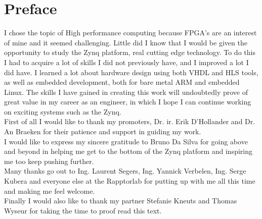 

\chapter*{Preface}


I chose the topic of High performance computing because FPGA's are an interest of mine and it seemed challenging. Little did I know that I would be given the opportunity to study the Zynq platform, real cutting edge technology. To do this I had to acquire a lot of skills I did not previously have, and I improved a lot I did have. I learned a lot about hardware design using both VHDL and HLS tools, as well as embedded development, both for bare metal ARM and embedded Linux. The skills I have gained in creating this work will undoubtedly prove of great value in my career as an engineer, in which I hope I can continue working on exciting systems such as the Zynq. \\

First of all I would like to thank my promoters, Dr. ir. Erik D'Hollander and Dr. An Braeken for their patience and support in guiding my work.\\

I would like to express my sincere gratitude to Bruno Da Silva for going above and beyond in helping me get to the bottom of the Zynq platform and inspiring me too keep pushing further. \\

Many thanks go out to Ing. Laurent Segers, Ing. Yannick Verbelen, Ing. Serge Kubera and everyone else at the Rapptorlab for putting up with me all this time and making me feel welcome.\\

Finally I would also like to thank my partner Stefanie Kneuts and Thomas Wyseur for taking the time to proof read this text. 



